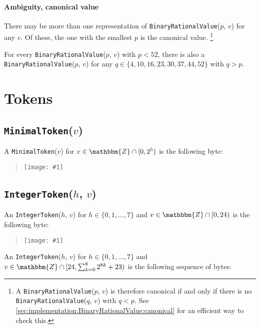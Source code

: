 \documentclass{dbor-article}
\newcommand{\SetOfIntegers}{\mathbbm{Z}}
\newcommand{\DborSyntaxIdent}[1]{\texttt{#1}}
\newcommand{\IncludeImageInPlace}[1]{%
        \begin{quotation}%
            \texttt{[image: \#1]}%
        \end{quotation}%
    }
\begin{document}
    \paragraph{Ambiguity, canonical value}

    There may be more than one representation of \DborSyntaxIdent{Binary\-Rational\-Value}($p$, $v$) for any $v$.
    Of these, the one with the smallest $p$ is the canonical value.%
    \footnote{
        A \DborSyntaxIdent{BinaryRationalValue}($p$, $v$) is therefore canonical if and only if there is
        no \DborSyntaxIdent{BinaryRationalValue}($q$, $v$) with $q < p$.
        See \ref{sec:implementation:BinaryRationalValue:canonical} for an efficient way to check this.
    }
    
    For every \DborSyntaxIdent{Binary\-Rational\-Value}($p$, $v$) with $p < 52$, there is also
    a \DborSyntaxIdent{Binary\-Rational\-Value}($p$, $v$) for any
    $q \in \{4, 10, 16, 23, 30, 37, 44, 52\}$ with $q > p$.

    
    \section{Tokens}
    \label{sec:tokens}

    \subsection{\DborSyntaxIdent{MinimalToken}($v$)}
    \hypertarget{sec:def:MinimalToken}{}

    A \DborSyntaxIdent{MinimalToken}($v$) for $v \in \SetOfIntegers \cap [0, 2^5)$
    is the following byte:

    \IncludeImageInPlace{MinimalToken.pdf}


    \subsection{\DborSyntaxIdent{IntegerToken}($h$, $v$)}
    \hypertarget{sec:def:IntegerToken}{}

    An \DborSyntaxIdent{IntegerToken}($h$, $v$) for $h \in \{0, 1, \ldots, 7\}$ and
    $v \in \SetOfIntegers \cap [0, 24)$ is the following byte:

    \IncludeImageInPlace{IntegerTokenA.pdf}
    
    An \DborSyntaxIdent{IntegerToken}($h$, $v$) for $h \in \{0, 1, \ldots, 7\}$ and
    $v \in \SetOfIntegers \cap [24, \sum_{k = 0}^8 2^{8k} + 23)$
    is the following sequence of bytes:
\end{document}
